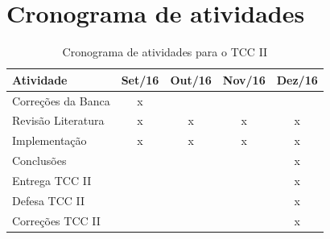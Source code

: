\section{Cronograma de atividades}

\begin{table}[!hb]
  \centering
  \caption{Cronograma de atividades para o TCC II}
  \begin{tabular}{l||cccc}
    \hline
    Atividade & Set/16 & Out/16 & Nov/16 & Dez/16\tabularnewline
    \hline \hline
    Correções da Banca & x &  &  & \tabularnewline
    Revisão Literatura & x & x & x & x\tabularnewline
    Implementação & x & x & x & x\tabularnewline
    Conclusões &  &  &  & x\tabularnewline
    Entrega TCC II &  &  &  & x\tabularnewline
    Defesa TCC II &  &  &  & x\tabularnewline
    Correções TCC II &  &  &  & x\tabularnewline
    \hline
  \end{tabular}
\end{table}

